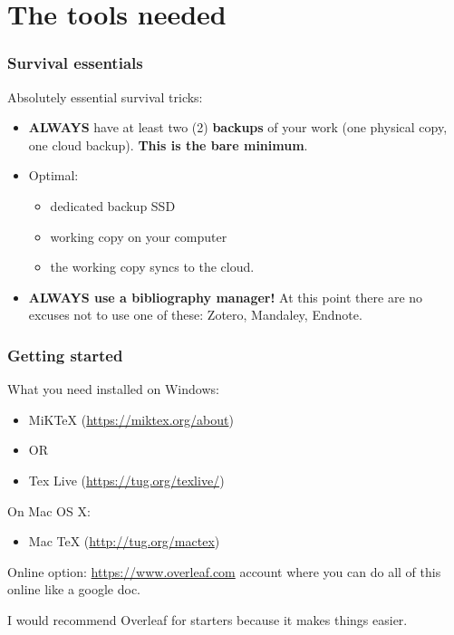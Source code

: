 \documentclass{beamer}
\begin{document}
\section{The tools needed}

\begin{frame}
\frametitle{Survival essentials}
Absolutely essential survival tricks:
\begin{itemize}
	\item \textbf{ALWAYS} have at least two (2) \textbf{backups} of your work (one physical copy, one cloud backup). \textbf{This is the bare minimum}. 
	\item Optimal: 
	\begin{itemize}
		\item dedicated backup SSD
		\item working copy on your computer
		\item the working copy syncs to the cloud.
	\end{itemize}
	\item \textbf{ALWAYS use a bibliography manager!} At this point there are no excuses not to use one of these: Zotero, Mandaley, Endnote. 
\end{itemize}
\end{frame}




\begin{frame}
\frametitle{Getting started}
What you need installed on Windows:
\begin{itemize}
\item MiKTeX  (\url{https://miktex.org/about})
\item OR
\item Tex Live (\url{https://tug.org/texlive/})
\end{itemize}

On Mac OS X:
\begin{itemize}
	\item Mac TeX (\url{http://tug.org/mactex})
\end{itemize}

\bigskip
Online option: \url{https://www.overleaf.com} account where you can do all of this online like a google doc.

I would recommend Overleaf for starters because it makes things easier.
\end{frame}
\end{document}
